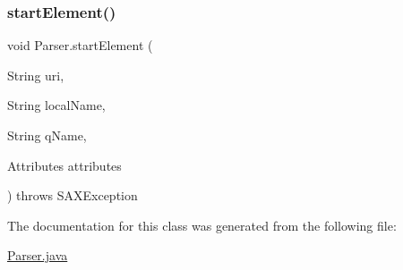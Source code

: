 \subsubsection{\texorpdfstring{start\+Element()}{startElement()}}
{\footnotesize\ttfamily void Parser.\+start\+Element (\begin{DoxyParamCaption}\item[{String}]{uri,  }\item[{String}]{local\+Name,  }\item[{String}]{q\+Name,  }\item[{Attributes}]{attributes }\end{DoxyParamCaption}) throws S\+A\+X\+Exception}



The documentation for this class was generated from the following file\+:\begin{DoxyCompactItemize}
\item 
\hyperlink{_parser_8java}{Parser.\+java}\end{DoxyCompactItemize}
